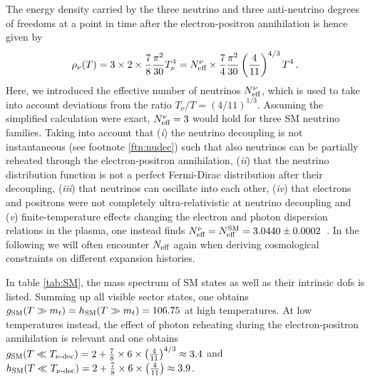 The energy density carried by  the three neutrino and three anti-neutrino degrees of freedoms at a point in time after the electron-positron annihilation is hence given by  
\begin{align}
	\rho_\nu(T) = 3 \times 2 \times \frac{7}{8} \frac{\pi^2}{30} T_\nu^4 = N_\text{eff}^\nu \times \frac{7}{4} \frac{\pi^2}{30}\left(\frac{4}{11}\right)^{4 / 3} T^4 \, . \label{eq:rhonuNeff}
\end{align}
Here, we introduced the effective number of neutrinos $N_\text{eff}^\nu$, which is used to take into account deviations from the ratio $T_\nu /T = (4/11)^{1/3}$. Assuming the simplified calculation were exact, $N_\text{eff}^\nu = 3$ would hold for three SM neutrino families. Taking into account that (\textit{i}) the neutrino decoupling is not instantaneous (see footnote \ref{ftn:nudec}) such that also neutrinos can be partially reheated through the electron-positron annihilation, (\textit{ii}) that the neutrino distribution function is not a perfect Fermi-Dirac distribution after their decoupling, (\textit{iii}) that neutrinos can oscillate into each other, (\textit{iv}) that electrons and positrons were not completely ultra-relativistic at neutrino decoupling and (\textit{v}) finite-temperature effects changing the electron and photon dispersion relations in the plasma, one instead finds $N_\text{eff}^\nu = N_\text{eff}^{\text{SM}} = 3.0440 \pm 0.0002$~\cite{Bennett:2020zkv}. In the following we will often encounter $N_\text{eff}$ again when deriving cosmological constraints on different expansion histories.

In table \ref{tab:SM}, the mass spectrum of \ac{SM} states as well as their intrinsic \acp{dof} is listed. Summing up all visible sector states, one obtains $g_{\text{SM}}(T \gg m_t) = h_{\text{SM}}(T \gg m_t ) = 106.75$ at  high temperatures. At low temperatures instead, the effect of photon reheating during the electron-positron annihilation is relevant and one obtains $g_{\text{SM}}(T \ll T_{\nu\text{-dec}}) = 2 + \frac{7}{8} \times 6 \times \left( \frac{4}{11} \right)^{4/3} \approx 3.4$ and $h_{\text{SM}}(T \ll T_{\nu\text{-dec}}) = 2 + \frac{7}{8} \times 6 \times \left( \frac{4}{11} \right) \approx 3.9$.

